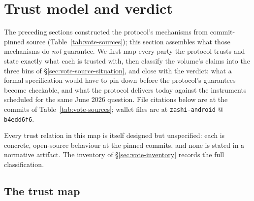 \documentclass[11pt,a4paper]{article}
\theoremstyle{definition}
\begin{document}
\section{Trust model and verdict}\label{sec:vote-trust}

The preceding sections constructed the protocol's mechanisms from
commit-pinned source (Table~\ref{tab:vote-sources}); this section assembles
what those mechanisms do \emph{not} guarantee. We first map every party the
protocol trusts and state exactly what each is trusted with, then classify
the volume's claims into the three bins of
\S\ref{sec:vote-source-situation}, and close with the verdict: what a
formal specification would have to pin down before the protocol's
guarantees become checkable, and what the protocol delivers today against
the instruments scheduled for the same June 2026 question. File citations
below are at the commits of Table~\ref{tab:vote-sources}; wallet files
are at \texttt{zashi-android} @ \texttt{b4edd6f6}.

Every trust relation in this map is itself designed but unspecified: each
is concrete, open-source behaviour at the pinned commits, and none is
stated in a normative artifact. The inventory of
\S\ref{sec:vote-inventory} records the full classification.

\subsection{The trust map}\label{sec:vote-trust-map}
\end{document}
